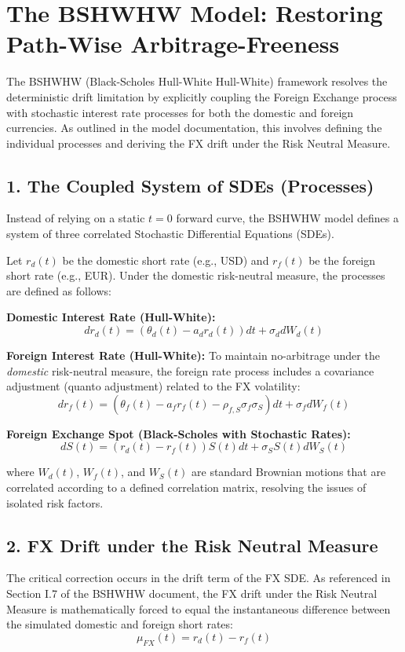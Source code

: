 
\section{The BSHWHW Model: Restoring Path-Wise Arbitrage-Freeness}

The BSHWHW (Black-Scholes Hull-White Hull-White) framework resolves the deterministic drift limitation by explicitly coupling the Foreign Exchange process with stochastic interest rate processes for both the domestic and foreign currencies. As outlined in the model documentation, this involves defining the individual processes and deriving the FX drift under the Risk Neutral Measure.

\subsection*{1. The Coupled System of SDEs (Processes)}
Instead of relying on a static $t=0$ forward curve, the BSHWHW model defines a system of three correlated Stochastic Differential Equations (SDEs). 

Let $r_d(t)$ be the domestic short rate (e.g., USD) and $r_f(t)$ be the foreign short rate (e.g., EUR). Under the domestic risk-neutral measure, the processes are defined as follows:

\textbf{Domestic Interest Rate (Hull-White):}
\begin{equation}
	dr_d(t) = \left( \theta_d(t) - a_d r_d(t) \right)dt + \sigma_d dW_d(t)
\end{equation}

\textbf{Foreign Interest Rate (Hull-White):}
To maintain no-arbitrage under the \textit{domestic} risk-neutral measure, the foreign rate process includes a covariance adjustment (quanto adjustment) related to the FX volatility:
\begin{equation}
	dr_f(t) = \left( \theta_f(t) - a_f r_f(t) - \rho_{f,S}\sigma_f\sigma_S \right)dt + \sigma_f dW_f(t)
\end{equation}

\textbf{Foreign Exchange Spot (Black-Scholes with Stochastic Rates):}
\begin{equation}
	dS(t) = \left( r_d(t) - r_f(t) \right)S(t)dt + \sigma_S S(t)dW_S(t)
\end{equation}

where $W_d(t)$, $W_f(t)$, and $W_S(t)$ are standard Brownian motions that are correlated according to a defined correlation matrix, resolving the issues of isolated risk factors.

\subsection*{2. FX Drift under the Risk Neutral Measure}
The critical correction occurs in the drift term of the FX SDE. As referenced in Section I.7 of the BSHWHW document, the FX drift under the Risk Neutral Measure is mathematically forced to equal the instantaneous difference between the simulated domestic and foreign short rates:
\begin{equation}
	\mu_{FX}(t) = r_d(t) - r_f(t)
\end{equation}

